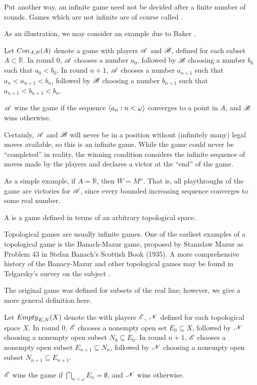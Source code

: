 Put another way, an infinite game need not be decided after a finite number
of rounds. Games which are not infinite are of course called
. 

As an illustration, we may consider an example due to 
Baker \cite{baker}. 

\begin{game}
  Let ${Con}_{A,B}(A)$ denote a game with players $\mathscr{A}$ and $\mathscr{B}$,
  defined for each subset $A\subset \mathbb{R}$.
  In round $0$, $\mathscr{A}$ chooses a number $a_0$, followed by $\mathscr{B}$ choosing
  a number $b_0$ such that $a_0<b_0$.
  In round $n+1$, $\mathscr{A}$ chooses a number $a_{n+1}$ such that 
  $a_n<a_{n+1}<b_n$, followed by $\mathscr{B}$ choosing a number $b_{n+1}$ such that
  $a_{n+1}<b_{n+1}<b_n$.

  $\mathscr{A}$ wins the game if the sequence $\langle a_n:n<\omega\rangle$ converges to a 
  point in $A$, and $\mathscr{B}$ wins otherwise.
\end{game}

Certainly, $\mathscr{A}$ and $\mathscr{B}$ will never be in
a position without (infinitely many) legal moves available, so this is
an infinite game. While the game could never be ``completed'' in reality,
the winning condition considers the infinite sequence of moves made by the
players and declares a victor at the ``end'' of the game.

As a simple example, if $A=\mathbb{R}$, then $W=M^\omega$. That is,
all playthroughs of the game are victories for $\mathscr{A}$, since every
bounded increasing sequence converges to some real number. 

\begin{defn}
  A  is a game defined in terms of an arbitrary
  topological space.
\end{defn}

Topological games are usually infinite games. One of the earliest examples
of a topological game is the Banach-Mazur game, proposed by Stanislaw Mazur
as Problem 43 in Stefan Banach's Scottish Book (1935). A more comprehensive
history of the Banacy-Mazur and other topological games may be found in 
Telgarsky's survey on the subject \cite{telgarsky}.

The original game was defined for subsets of the real line; however, 
we give a more general definition here.

\begin{game}
  Let ${Empty}_{E,N}(X)$ denote the  with players $\mathscr{E}$,
  $\mathscr{N}$ defined for each topological space $X$.
  In round $0$, $\mathscr{E}$ chooses a nonempty open set $E_0\subseteq X$, followed
  by $\mathscr{N}$ choosing a nonempty open subset $N_0\subseteq E_0$.
  In round $n+1$, $\mathscr{E}$ chooses a nonempty open subset $E_{n+1}\subseteq N_n$, 
  followed by $\mathscr{N}$ choosing a nonempty open subset 
  $N_{n+1}\subseteq E_{n+1}$.

  $\mathscr{E}$ wins the game if $\bigcap_{n<\omega} E_n = \emptyset$, 
  and $\mathscr{N}$ wins otherwise.
\end{game}

